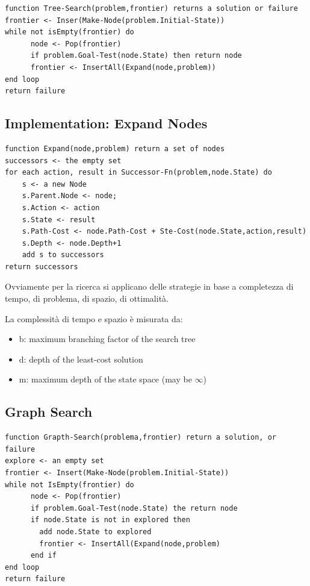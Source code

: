 \documentclass[12pt, a4paper]{article}
\begin{document}
\begin{lstlisting}
function Tree-Search(problem,frontier) returns a solution or failure
frontier <- Inser(Make-Node(problem.Initial-State))
while not isEmpty(frontier) do
      node <- Pop(frontier)
      if problem.Goal-Test(node.State) then return node
      frontier <- InsertAll(Expand(node,problem))
end loop
return failure
\end{lstlisting}

\subsection{Implementation: Expand Nodes}
\begin{lstlisting}
function Expand(node,problem) return a set of nodes
successors <- the empty set
for each action, result in Successor-Fn(problem,node.State) do
    s <- a new Node
    s.Parent.Node <- node;
    s.Action <- action
    s.State <- result
    s.Path-Cost <- node.Path-Cost + Ste-Cost(node.State,action,result)
    s.Depth <- node.Depth+1
    add s to successors
return successors
\end{lstlisting}

Ovviamente per la ricerca si applicano delle strategie in base a completezza di tempo, di problema, di spazio, di ottimalità.

La complessità di tempo e spazio è misurata da:
\begin{itemize}
  \item b: maximum branching factor of the search tree
  \item d: depth of the least-cost solution
  \item m: maximum depth of the state space (may be $\infty$)
\end{itemize}

\subsection{Graph Search}
\begin{lstlisting}
function Grapth-Search(problema,frontier) return a solution, or failure
explore <- an empty set
frontier <- Insert(Make-Node(problem.Initial-State))
while not IsEmpty(frontier) do
      node <- Pop(frontier)
      if problem.Goal-Test(node.State) the return node
      if node.State is not in explored then
        add node.State to explored
        frontier <- InsertAll(Expand(node,problem)
      end if
end loop
return failure
\end{lstlisting}
\end{document}
